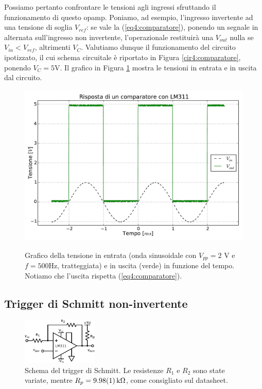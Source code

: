 Possiamo pertanto confrontare le tensioni agli ingressi sfruttando il funzionamento di questo opamp.
Poniamo, ad esempio, l'ingresso invertente ad una tensione di soglia $V_{ref}$: se vale la (\ref{eq4:comparatore}), ponendo un segnale in alternata sull'ingresso non invertente, l'operazionale restituirà una $V_{out}$ nulla se $V_{in}<V_{ref}$, altrimenti $V_C$.
Valutiamo dunque il funzionamento del circuito ipotizzato, il cui schema circuitale è riportato in Figura \ref{cir4:comparatore}, ponendo $V_{C}=5$\si{\volt}.
Il grafico in Figura \ref{gr4:comparatore} mostra le tensioni in entrata e in uscita dal circuito.
\newpage
\begin{figure}[ht]
 \centering
   {\includegraphics[width=14cm]{../E04/latex/comp.pdf}}
 \caption{Grafico della tensione in entrata (onda sinusoidale con $V_{pp}=2$ \si{\volt} e $f=500$\si{\hertz}, tratteggiata) e in uscita (verde) in funzione del tempo. Notiamo che l'uscita rispetta (\ref{eq4:comparatore}).}
 \label{gr4:comparatore}
\end{figure}

\subsection{Trigger di Schmitt non-invertente}

\begin{figure}
  \begin{center}
    \includegraphics[width=0.320\textwidth]{../E04/latex/c_schmitt.pdf}
  \end{center}
  \caption{Schema del trigger di Schmitt. Le resistenze $R_1$ e $R_2$ sono state variate, mentre $R_p=\SI{9.98\pm0.01}{\kilo\ohm}$, come consigliato sul datasheet.}
  \label{cir4:schmitt}
\end{figure}

